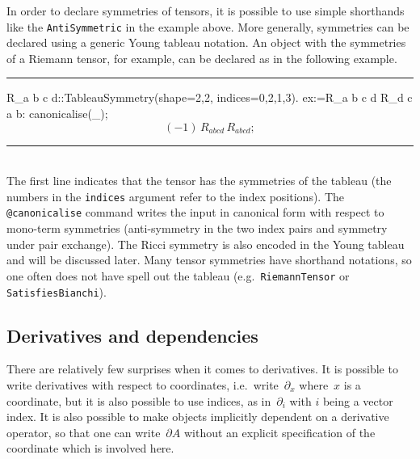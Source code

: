 \documentclass[11pt]{article}
\newcommand{\toprule}{\par\vspace{1ex}\noindent\hspace{25pt}\rule{435pt}{.1pt}}
\newcommand{\botrule}{\noindent\hspace{25pt}\rule{435pt}{.1pt}\\[2ex]}
\newenvironment{cdbin}{\fvset{firstnumber=1}\color[named]{Blue}\Verbatim}{\endVerbatim}
\newenvironment{cdbout}{\vspace{-1ex}\begin{equation}}{\end{equation}\vspace{-1ex}}
\begin{document}
In order to declare symmetries of tensors, it is possible to use
simple shorthands like the \verb|AntiSymmetric| in the example above. 
More generally, symmetries can be declared using  a generic Young
tableau notation. An object with the symmetries of a Riemann tensor,
for example, can be declared as in the following example.
\toprule
\begin{cdbin}
R_{a b c d}::TableauSymmetry(shape={2,2}, indices={0,2,1,3}).
ex:=R_{a b c d} R_{d c a b}:
canonicalise(_);
\end{cdbin}
\begin{cdbout}
(-1)\, R_{a b c d}\, R_{a b c d};
\end{cdbout}
\botrule
The first line indicates that the tensor has the symmetries of the
 tableau (the numbers in the \verb|indices| argument
refer to the index positions). The \verb|@canonicalise| command writes
the input in canonical form with respect to mono-term symmetries
(anti-symmetry in the two index pairs and symmetry under pair
exchange). The Ricci symmetry is also encoded in the Young tableau and
will be discussed later. Many tensor symmetries have shorthand
notations, so one often does not have spell out the tableau (e.g.~\verb|RiemannTensor| or \verb|SatisfiesBianchi|).

\subsection{Derivatives and dependencies}
\label{s:derivatives}

There are relatively few surprises when it comes to derivatives.
It is possible to write derivatives with respect to coordinates,
i.e.~write~$\partial_x$ where~$x$ is a coordinate, but
it is also possible to use indices, as in~$\partial_i$ with $i$ being
a vector index. It is also possible to make objects implicitly
dependent on a derivative operator, so that one can write~$\partial
A$ without an explicit specification of the coordinate which is
involved here. 
\end{document}
